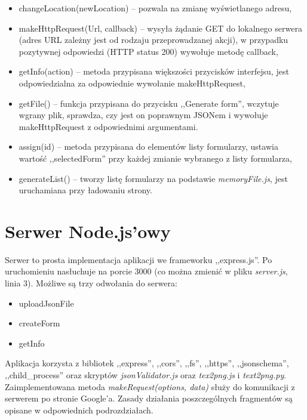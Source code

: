 \begin{itemize}
\item changeLocation(newLocation) -- pozwala na zmianę wyświetlanego adresu,
\item makeHttpRequest(Url, callback) -- wysyła żądanie GET do lokalnego serwera (adres URL zależny jest od rodzaju przeprowadzanej akcji), w przypadku pozytywnej odpowiedzi (HTTP status 200) wywołuje metodę callback,
\item getInfo(action) -- metoda przypisana większości przycisków interfejsu, jest odpowiedzialna za odpowiednie wywołanie makeHttpRequest,
\item getFile() -- funkcja przypisana do przycisku ,,Generate form'', wczytuje wgrany plik, sprawdza, czy jest on poprawnym JSONem i wywołuje makeHttpRequest z odpowiednimi argumentami.
\item assign(id) -- metoda przypisana do elementów listy formularzy, ustawia wartość ,,selectedForm'' przy każdej zmianie wybranego z listy formularza,
\item generateList() -- tworzy listę formularzy na podstawie \textit{memoryFile.js}, jest uruchamiana przy ładowaniu strony.
\end{itemize}


\section{Serwer Node.js'owy}
Serwer to prosta implementacja aplikacji we frameworku ,,express.js''. Po uruchomieniu nasłuchuje na porcie 3000 (co można zmienić w pliku \textit{server.js}, linia 3). Możliwe są trzy odwołania do serwera:
\begin{itemize}
\item uploadJsonFile
\item createForm
\item getInfo
\end{itemize}
Aplikacja korzysta z bibliotek ,,express'', ,,cors'', ,,fs'', ,,https'', ,,jsonschema'', ,,child\_process''  oraz skryptów \textit{jsonValidator.js} oraz \textit{tex2png.js} i \textit{text2png.py}.
Zaimplementowana metoda \textit{makeRequest(options, data)} służy do komunikacji z serwerem po stronie Google'a.
\ind Zasady działania poszczególnych fragmentów są opisane w odpowiednich podrozdziałach.
